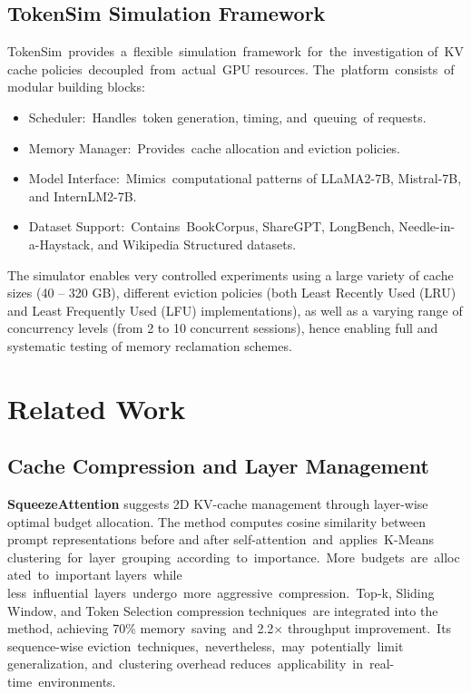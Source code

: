 \documentclass[sigconf,nonacm]{acmart}
\begin{document}
\subsection{TokenSim Simulation Framework}
\label{sec:subsection}
TokenSim provides a flexible simulation framework for the investigation of KV cache policies decoupled from actual GPU resources. The platform consists of modular building blocks:
\begin{itemize}[leftmargin=*, topsep=1ex, partopsep=0pt, itemsep=0pt, parsep=0pt]
\item Scheduler: Handles token generation, timing, and queuing of requests.
\item Memory Manager: Provides cache allocation and eviction policies.
\item Model Interface: Mimics computational patterns of LLaMA2-7B, Mistral-7B, and InternLM2-7B.
\item Dataset Support: Contains BookCorpus, ShareGPT, LongBench, Needle-in-a-Haystack, and Wikipedia Structured datasets.
\end{itemize}
The simulator enables very controlled experiments using a large variety of cache sizes (40 – 320 GB), different eviction policies (both Least Recently Used (LRU) and Least Frequently Used (LFU) implementations), as well as a varying range of concurrency levels (from 2 to 10 concurrent sessions), hence enabling full and systematic testing of memory reclamation schemes.


\clearpage
\section {Related Work}
\subsection{Cache Compression and Layer Management
}
\label{sec:subsection}
\textbf{SqueezeAttention} \cite{wang2024squeezeattention2dmanagementkvcache} suggests 2D KV-cache management through layer-wise optimal budget allocation. The method computes cosine similarity between prompt representations before and after self-attention and applies K-Means clustering for layer grouping according to importance. More budgets are allocated to important layers while less influential layers undergo more aggressive compression. Top-k, Sliding Window, and Token Selection compression techniques are integrated into the method, achieving 70\% memory saving and 2.2× throughput improvement. Its sequence-wise eviction techniques, nevertheless, may potentially limit generalization, and clustering overhead reduces applicability in real-time environments.
\end{document}
